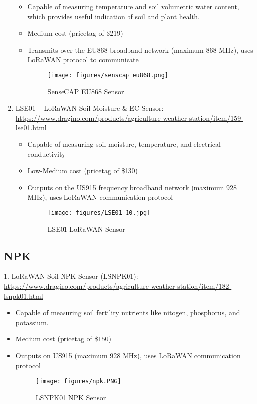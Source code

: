 \documentclass{article}
\begin{document}
\begin{enumerate}
\begin{itemize}
\item Capable of measuring temperature and soil volumetric water content, which provides useful indication of soil and plant health.
\item Medium cost (pricetag of \$219)
\item Transmits over the EU868 broadband network (maximum 868 MHz), uses LoRaWAN protocol to communicate

\begin{figure}[htp]
    \centering
    \texttt{[image: figures/senscap eu868.png]}
    \caption{SenseCAP EU868 Sensor}
\end{figure}

\end{itemize}

\item LSE01 -- LoRaWAN Soil Moisture & EC Sensor: \url{https://www.dragino.com/products/agriculture-weather-station/item/159-lse01.html}
\begin{itemize}

\item Capable of measuring soil moisture, temperature, and electrical conductivity
\item Low-Medium cost (pricetag of \$130)	
\item Outputs on the US915 frequency broadband network (maximum 928 MHz), uses LoRaWAN communication protocol

\begin{figure}[htp]
    \centering
    \texttt{[image: figures/LSE01-10.jpg]}
    \caption{LSE01 LoRaWAN Sensor}
\end{figure}

\end{itemize}
\end{enumerate}


\subsection{NPK}
1. LoRaWAN Soil NPK Sensor (LSNPK01): \url{https://www.dragino.com/products/agriculture-weather-station/item/182-lsnpk01.html}
\begin{itemize}

\item Capable of measuring soil fertility nutrients like nitogen, phosphorus, and potassium.
\item Medium cost (pricetag of \$150)
\item Outputs on US915 (maximum 928 MHz), uses LoRaWAN communication protocol

\begin{figure}[htp]
    \centering
    \texttt{[image: figures/npk.PNG]}
    \caption{LSNPK01 NPK Sensor}
\end{figure}

\end{itemize}
\end{document}
